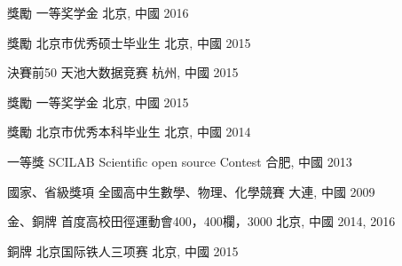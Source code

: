 \begin{cvhonors}
\cvhonor
{獎勵} %
{一等奖学金} %
{北京, 中國} %
{2016} %

\cvhonor
{獎勵} %
{北京市优秀硕士毕业生} %
{北京, 中國} %
{2015} %


\cvhonor
{決賽前50} %
{天池大数据竞赛} %
{杭州, 中國} %
{2015} %






\cvhonor
{獎勵} %
{一等奖学金} %
{北京, 中國} %
{2015} %


\cvhonor
{獎勵} %
{北京市优秀本科毕业生} %
{北京, 中國} %
{2014} %



\cvhonor
{一等獎} %
{SCILAB Scientific open source Contest} %
{合肥, 中國} %
{2013} %


\cvhonor
{國家、省級獎項} %
{全國高中生數學、物理、化學競賽} %
{大連, 中國} %
{2009} %


\cvhonor
{金、銅牌} %
{首度高校田徑運動會400，400欄，3000} %
{北京, 中國} %
{2014, 2016} %

\cvhonor
{銅牌} %
{北京国际铁人三项赛} %
{北京, 中國} %
{2015} %


\end{cvhonors}
